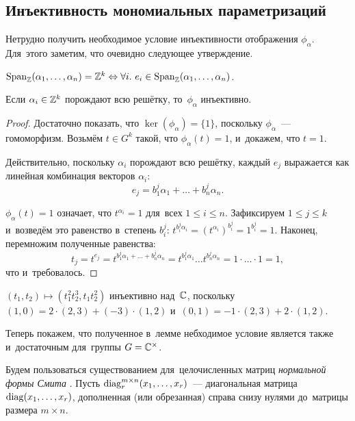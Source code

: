 \documentclass[a4paper,oneside]{article}
\begin{document}
\subsection{Инъективность мономиальных параметризаций}
Нетрудно получить необходимое условие инъективности отображения $\phi_\alpha$.
Для~этого заметим, что очевидно следующее утверждение.

\begin{statement*}
  $\mathrm{Span}_{\mathbb{Z}}(\alpha_1, \ldots, \alpha_n) = \mathbb{Z}^k \Leftrightarrow \forall i.\ e_i \in \mathrm{Span}_{\mathbb{Z}}(\alpha_1, \ldots, \alpha_n)$.
\end{statement*}

\begin{lemma}
  Если $\alpha_i \in \mathbb{Z}^k$ порождают всю решётку, то~$\phi_\alpha$ инъективно.
\end{lemma}

\begin{proof}
  Достаточно показать, что $\ker(\phi_\alpha) = \{1\}$, поскольку $\phi_\alpha$~— гомоморфизм.
  Возьмём $t \in G^k$ такой, что $\phi_\alpha(t) = 1$, и~докажем, что $t = 1$.

  Действительно, поскольку $\alpha_i$ порождают всю решётку, каждый $e_j$ выражается как линейная комбинация векторов $\alpha_i$:
  \[
    e_j = b^j_1 \alpha_1 + \ldots + b^j_n \alpha_n.
  \]

  $\phi_\alpha(t) = 1$ означает, что $t^{\alpha_i} = 1$ для~всех $1 \leq i \leq n$.
  Зафиксируем $1 \leq j \leq k$ и~возведём это равенство в~степень $b^j_i$: $t^{b^j_i \alpha_i} = (t^{\alpha_i})^{b^j_i} = 1^{b^j_i} = 1$.
  Наконец, перемножим полученные равенства:
  \[
    t_j = t^{e_j} = t^{b^j_1 \alpha_1 + \ldots + b^j_n \alpha_n} = t^{b^j_1 \alpha_1} \ldots t^{b^j_n \alpha_n} = 1 \cdot \ldots \cdot 1 = 1,
  \]
  что и~требовалось.
\end{proof}

\begin{example*}
  $(t_1, t_2) \mapsto (t_1^2 t_2^3, t_1 t_2^2)$ инъективно над~$\mathbb{C}$,
  поскольку $(1, 0) = 2 \cdot (2, 3) + (-3) \cdot (1, 2)$ и~$(0, 1) = -1 \cdot (2, 3) + 2 \cdot (1, 2)$.
\end{example*}

Теперь покажем, что полученное в~лемме небходимое условие является также и~достаточным для~группы $G = \mathbb{C}^\times$.

Будем пользоваться существованием для~целочисленных матриц \textit{нормальной формы Смита} \cite{Smth60}.
Пусть $\mathrm{diag}^{m \times n}_r(x_1, \ldots, x_r)$~— диагональная матрица $\mathrm{diag}(x_1, \ldots, x_r)$,
дополненная (или обрезанная) справа снизу нулями до~матрицы размера $m \times n$.
\end{document}
